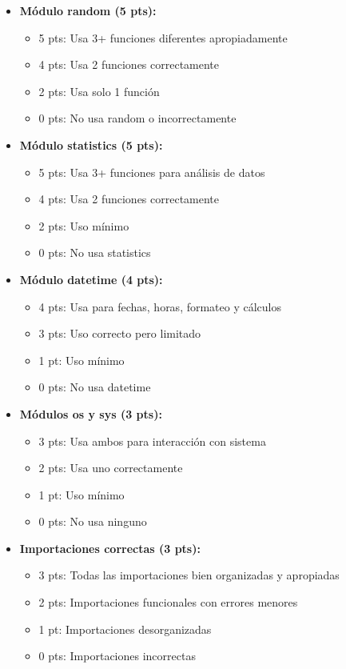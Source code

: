 \documentclass[12pt,a4paper]{article}
\begin{document}
\begin{itemize}[leftmargin=*]
    \item \textbf{Módulo random (5 pts):}
    \begin{itemize}
        \item 5 pts: Usa 3+ funciones diferentes apropiadamente
        \item 4 pts: Usa 2 funciones correctamente
        \item 2 pts: Usa solo 1 función
        \item 0 pts: No usa random o incorrectamente
    \end{itemize}
    
    \item \textbf{Módulo statistics (5 pts):}
    \begin{itemize}
        \item 5 pts: Usa 3+ funciones para análisis de datos
        \item 4 pts: Usa 2 funciones correctamente
        \item 2 pts: Uso mínimo
        \item 0 pts: No usa statistics
    \end{itemize}
    
    \item \textbf{Módulo datetime (4 pts):}
    \begin{itemize}
        \item 4 pts: Usa para fechas, horas, formateo y cálculos
        \item 3 pts: Uso correcto pero limitado
        \item 1 pt: Uso mínimo
        \item 0 pts: No usa datetime
    \end{itemize}
    
    \item \textbf{Módulos os y sys (3 pts):}
    \begin{itemize}
        \item 3 pts: Usa ambos para interacción con sistema
        \item 2 pts: Usa uno correctamente
        \item 1 pt: Uso mínimo
        \item 0 pts: No usa ninguno
    \end{itemize}
    
    \item \textbf{Importaciones correctas (3 pts):}
    \begin{itemize}
        \item 3 pts: Todas las importaciones bien organizadas y apropiadas
        \item 2 pts: Importaciones funcionales con errores menores
        \item 1 pt: Importaciones desorganizadas
        \item 0 pts: Importaciones incorrectas
    \end{itemize}
\end{itemize}
\end{document}
